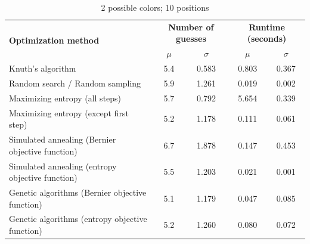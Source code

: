\documentclass[11pt]{article}
\begin{document}
\begin{table}[h!]
\begin{center}
\begin{tabular}{l c c c c}
\toprule
\multirow{2}{*}{\bfseries Optimization method} 		& \multicolumn{2}{c}{\bfseries Number of guesses} 		& \multicolumn{2}{c}{\bfseries Runtime (seconds)}	\\
\cmidrule(lr){2-3}  \cmidrule(lr){4-5}				& $\mu$ & $\sigma$								& $\mu$ & $\sigma$							\\
\cmidrule(lr){1-5}
Knuth's algorithm							& 5.4 & 0.583									& 0.803 & 0.367							\\
Random search / Random sampling				& 5.9 & 1.261									& 0.019 & 0.002							\\
Maximizing entropy (all steps)					& 5.7 & 0.792									& 5.654 & 0.339							\\
Maximizing entropy (except first step)			& 5.2 & 1.178									& 0.111 & 0.061							\\
Simulated annealing (Bernier objective function)	& 6.7 & 1.878									& 0.147 & 0.453							\\
Simulated annealing (entropy objective function)	& 5.5 & 1.203									& 0.021 & 0.001							\\
Genetic algorithms (Bernier objective function)		& 5.1 & 1.179									& 0.047 & 0.085							\\
Genetic algorithms (entropy objective function)		& 5.2 & 1.260									& 0.080 & 0.072							\\
\bottomrule
\end{tabular}
\end{center}
\caption{2 possible colors; 10 positions}
\label{fig:compare_2_10}
\end{table}

\newpage

\nocite{runarsson2010adapting}
\nocite{merelo2010finding}
\nocite{doerr2013playing}
\nocite{merelo2013improving}
\nocite{neuwirth1982some}
\nocite{kooi2005yet}
\nocite{berghman2009efficient}

 

\end{document}
